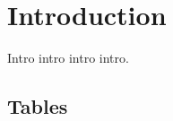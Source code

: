 \chapter{Introduction}
\begin{chapabstract}

Intro intro intro intro.

\end{chapabstract}
\section{Tables}

%
%
%




%
%
